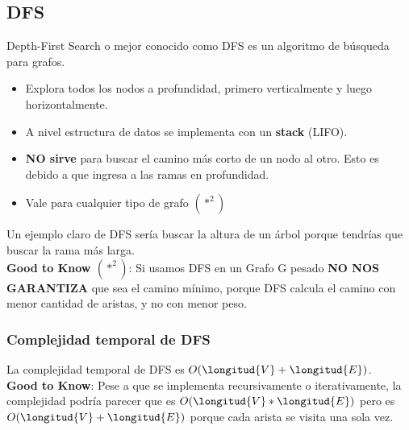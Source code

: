 \documentclass[10pt,a4paper]{article}
\begin{document}
\subsection*{DFS}
Depth-First Search o mejor conocido como DFS es un algoritmo de búsqueda para grafos. 
\begin{itemize}
    \item Explora todos los nodos a profundidad, primero verticalmente y luego horizontalmente.
    \item A nivel estructura de datos se implementa con un \textbf{stack} (LIFO).
    \item \textbf{NO sirve} para buscar el camino más corto de un nodo al otro. Esto es debido a que ingresa a las ramas en profundidad.
    \item Vale para cualquier tipo de grafo $(*^{2})$
\end{itemize}
Un ejemplo claro de DFS sería buscar la altura de un árbol porque tendrías que buscar la rama más larga. \\
\textbf{Good to Know $(*^{2})$}: Si usamos DFS en un Grafo G pesado \textbf{NO NOS GARANTIZA} que sea el camino mínimo, porque DFS calcula el camino con menor cantidad de aristas, y no con menor peso. 
\subsubsection*{Complejidad temporal de DFS}
La complejidad temporal de DFS es $O(\longitud{V} + \longitud{E})$. \\
\textbf{Good to Know}: Pese a que se implementa recursivamente o iterativamente, la complejidad podría parecer que es $O(\longitud{V} * \longitud{E})$ pero es $O(\longitud{V} + \longitud{E})$ porque cada arista se visita una sola vez.
\end{document}
